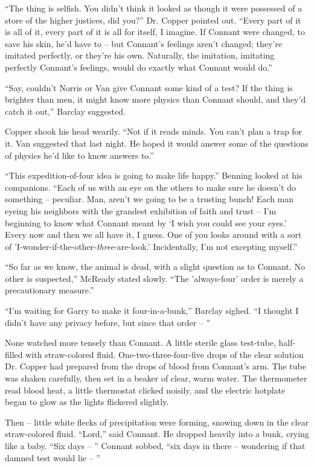 \documentclass[letterpaper,openany,12pt]{memoir}		%
\begin{document}
``The thing is selfish. You didn't think it looked as though it were possessed
of a store of the higher justices, did you?'' Dr. Copper pointed out. ``Every
part of it is all of it, every part of it is all for itself, I imagine. If
Connant were changed, to save his skin, he'd have to -- but Connant's feelings
aren't changed; they're imitated perfectly, or they're his own. Naturally, the
imitation, imitating perfectly Connant's feelings, would do exactly what Connant
would do.''

``Say, couldn't Norris or Van give Connant some kind of a test? If the thing is
brighter than men, it might know more physics than Connant should, and they'd
catch it out,'' Barclay suggested.

Copper shook his head wearily. ``Not if it reads minds. You can't plan a trap
for it. Van suggested that last night. He hoped it would answer some of the
questions of physics he'd like to know answers to.''

``This expedition-of-four idea is going to make life happy.'' Benning looked at
his companions. ``Each of us with an eye on the others to make sure he doesn't
do something -- peculiar. Man, aren't we going to be a trusting bunch! Each man
eyeing his neighbors with the grandest exhibition of faith and trust -- I'm
beginning to know what Connant meant by `I wish you could see your eyes.' Every
now and then we all have it, I guess. One of you looks around with a sort of
'I-wonder-if-the-other-\emph{three}-are-look.' Incidentally, I'm not excepting
myself.''

``So far as we know, the animal is dead, with a slight question as to Connant.
No other is suspected,'' McReady stated slowly. ``The 'always-four' order is
merely a precautionary measure.''

``I'm waiting for Garry to make it four-in-a-bunk,'' Barclay sighed. ``I thought
I didn't have any privacy before, but since that order -- ''

None watched more tensely than Connant. A little sterile glass test-tube,
half-filled with straw-colored fluid. One-two-three-four-five drops of the clear
solution Dr. Copper had prepared from the drops of blood from Connant's arm. The
tube was shaken carefully, then set in a beaker of clear, warm water. The
thermometer read blood heat, a little thermostat clicked noisily, and the
electric hotplate began to glow as the lights flickered slightly.

Then -- little white flecks of precipitation were forming, snowing down in the
clear straw-colored fluid. ``Lord,'' said Connant. He dropped heavily into a
bunk, crying like a baby. ``Six days -- '' Connant sobbed, ``six days in there
-- wondering if that damned test would lie -- ''
\end{document}
